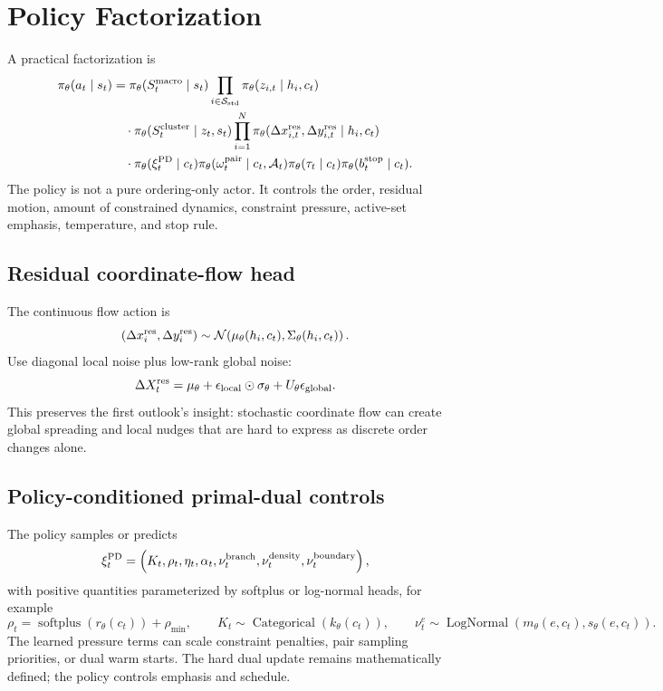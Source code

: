 \documentclass[11pt]{article}
\newcommand{\softplus}{\operatorname{softplus}}
\newcommand{\Cat}{\operatorname{Categorical}}
\newcommand{\Normal}{\mathcal{N}}
\newcommand{\LogNormal}{\operatorname{LogNormal}}
\newcommand{\Audit}{\mathcal{A}}
\newcommand{\Std}{\mathcal{S}_{\rm std}}
\begin{document}
\section{Policy Factorization}

A practical factorization is
\[
\begin{aligned}
\pi_\theta(a_t\mid s_t)
&=\pi_\theta(S_t^{\rm macro}\mid s_t)
\prod_{i\in\Std}\pi_\theta(z_{i,t}\mid h_i,c_t)\\
&\quad\cdot
\pi_\theta(S_t^{\rm cluster}\mid z_t,s_t)
\prod_{i=1}^N\pi_\theta(\Delta x^{\rm res}_{i,t},\Delta y^{\rm res}_{i,t}\mid h_i,c_t)\\
&\quad\cdot
\pi_\theta(\xi_t^{\rm PD}\mid c_t)
\pi_\theta(\omega_t^{\rm pair}\mid c_t,\Audit_t)
\pi_\theta(\tau_t\mid c_t)
\pi_\theta(b_t^{\rm stop}\mid c_t).
\end{aligned}
\]
The policy is not a pure ordering-only actor. It controls the order, residual motion, amount of constrained dynamics, constraint pressure, active-set emphasis, temperature, and stop rule.

\subsection{Residual coordinate-flow head}

The continuous flow action is
\[
    (\Delta x_i^{\rm res},\Delta y_i^{\rm res})
    \sim \Normal\!\left(\mu_\theta(h_i,c_t),\Sigma_\theta(h_i,c_t)\right).
\]
Use diagonal local noise plus low-rank global noise:
\[
    \Delta X_t^{\rm res}
    =\mu_\theta
    +\epsilon_{\rm local}\odot\sigma_\theta
    +U_\theta\epsilon_{\rm global}.
\]
This preserves the first outlook's insight: stochastic coordinate flow can create global spreading and local nudges that are hard to express as discrete order changes alone.

\subsection{Policy-conditioned primal-dual controls}

The policy samples or predicts
\[
    \xi_t^{\rm PD}=\left(K_t,\rho_t,\eta_t,\alpha_t,\nu_t^{\rm branch},\nu_t^{\rm density},\nu_t^{\rm boundary}\right),
\]
with positive quantities parameterized by softplus or log-normal heads, for example
\[
    \rho_t=\softplus(r_\theta(c_t))+\rho_{\min},
    \qquad
    K_t\sim\Cat(k_\theta(c_t)),
    \qquad
    \nu_t^e\sim\LogNormal(m_\theta(e,c_t),s_\theta(e,c_t)).
\]
The learned pressure terms can scale constraint penalties, pair sampling priorities, or dual warm starts. The hard dual update remains mathematically defined; the policy controls emphasis and schedule.
\end{document}
